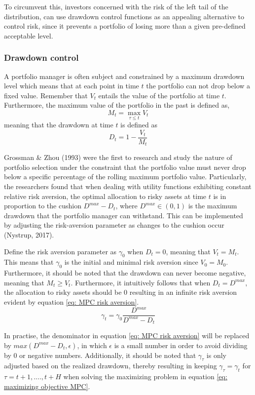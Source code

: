To circumvent this, investors concerned with the risk of the left tail of the distribution, can use drawdown control functions as an appealing alternative to control risk, since it prevents a portfolio of losing more than a given pre-defined acceptable level. 

\subsubsection{Drawdown control}
A portfolio manager is often subject and constrained by a maximum drawdown level which means that at each point in time $t$ the portfolio can not drop below a fixed value. Remember that $V_t$ entails the value of the portfolio at time $t$. Furthermore, the maximum value of the portfolio in the past is defined as,
\begin{equation}
    M_t = \max_{\tau \leq t} V_t
\end{equation}
meaning that the drawdown at time $t$ is defined as 
\begin{equation}
    D_t = 1 - \frac{V_t}{M_t}
\end{equation}

Grossman \& Zhou (1993) were the first to research and study the nature of portfolio selection under the constraint that the portfolio value must never drop below a specific percentage of the rolling maximum portfolio value. Particularly, the researchers found that when dealing with utility functions exhibiting constant relative risk aversion, the optimal allocation to risky assets at time $t$ is in proportion to the cushion $D^{max}-D_t$, where $D^{max} \in (0,1)$ is the maximum drawdown that the portfolio manager can withstand. This can be implemented by adjusting the risk-aversion parameter as changes to the cushion occur (Nystrup, 2017).

Define the risk aversion parameter as $\gamma_0$ when $D_t = 0$, meaning that $V_t = M_t$. This means that $\gamma_0$ is the initial and minimal risk aversion since $V_0 = M_0$. Furthermore, it should be noted that the drawdown can never become negative, meaning that $M_t \geq V_t$. Furthermore, it intuitively follows that when $D_t = D^{max}$, the allocation to risky assets should be 0 resulting in an infinite risk aversion evident by equation \ref{eq: MPC risk aversion}.
\begin{equation}
\gamma_t = \gamma_0 \frac{D^{max}}{D^{max}-D_t}
    \label{eq: MPC risk aversion}
\end{equation}

In practise, the denominator in equation \ref{eq: MPC risk aversion} will be replaced by $max(D^{max}-D_t,\epsilon)$, in which $\epsilon$ is a small number in order to avoid dividing by 0 or negative numbers. Additionally, it should be noted that $\gamma_\tau$ is only adjusted based on the realized drawdown, thereby resulting in keeping $\gamma_\tau = \gamma_t$ for $\tau = t+1,...., t+H$ when solving the maximizing problem in equation \ref{eq: maximizing objective MPC}.

